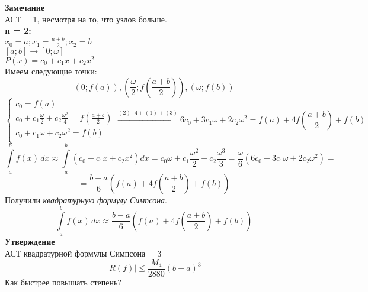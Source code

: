 \textbf{Замечание}\\
АСТ = 1, несмотря на то, что узлов больше.\\
\textbf{n = 2:}\\
$x_0 = a; x_1 = \frac{a+b}{2}; x_2 = b$\\
$[a;b] \to [0;\omega]$\\
$P(x) = c_0+c_1x+ c_2x^2$\\
Имеем следующие точки:
\[
(0;f(a)), (\frac{\omega}{2};f(\frac{a+b}{2})), (\omega;f(b))
\]
\[
\begin{cases}
c_0 = f(a)\\
c_0 + c_1\frac{\omega}{2} + c_2\frac{\omega^2}{4} = f(\frac{a+b}{2})\\
c_0 + c_1\omega + c_2\omega^2 = f(b)\\
\end{cases}
\overset{(2)\cdot4+(1)+(3)}{\to}
6c_0 + 3c_1\omega+2c_2\omega^2=f(a) +4f(\frac{a+b}{2}) + f(b)
\]
\[
\int\limits_{a}^{b} f(x) \, dx \approx  \int\limits_{a}^{b}(c_0+c_1x+c_2x^2)dx =c_0\omega+c_1\frac{\omega^2}{2} + c_2\frac{\omega^3}{3} = \frac{\omega}{6}(6c_0+3c_1\omega+2c_2\omega^2) =
\]
\[
=\frac{b-a}{6}(f(a)+4f(\frac{a+b}{2}) + f(b))
\]
Получили \textit{квадратурную формулу Симпсона}.\\
\[
\int\limits_{a}^{b} f(x) \, dx \approx\frac{b-a}{6}(f(a)+4f(\frac{a+b}{2}) + f(b))
\]
\textbf{Утверждение}\\
АСТ квадратурной формулы Симпсона = 3\\
\[
|R(f)| \leq \frac{M_4}{2880}(b-a)^3
\]
Как быстрее повышать степень?\\
